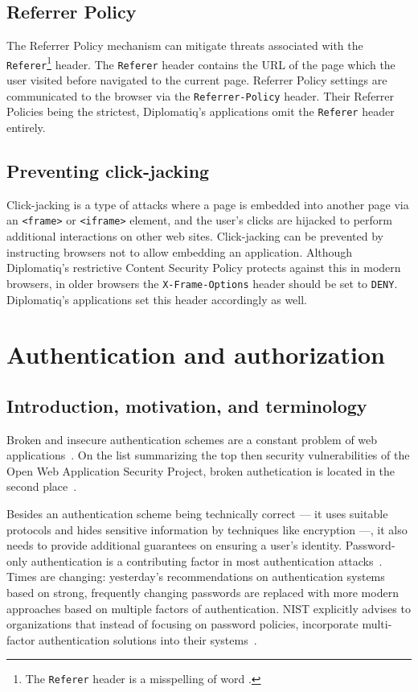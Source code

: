 \subsection{Referrer Policy}

The Referrer Policy mechanism can mitigate threats associated with the \lstinline{Referer}\footnote{The \lstinline{Referer} header is a misspelling of word .} header. The \lstinline{Referer} header contains the URL of the page which the user visited before navigated to the current page. Referrer Policy settings are communicated to the browser via the \lstinline{Referrer-Policy} header. Their Referrer Policies being the strictest, Diplomatiq's applications omit the \lstinline{Referer} header entirely.

\subsection{Preventing click-jacking}

Click-jacking is a type of attacks where a page is embedded into another page via an \lstinline{<frame>} or \lstinline{<iframe>} element, and the user's clicks are hijacked to perform additional interactions on other web sites. Click-jacking can be prevented by instructing browsers not to allow embedding an application. Although Diplomatiq's restrictive Content Security Policy protects against this in modern browsers, in older browsers the \lstinline{X-Frame-Options} header should be set to \lstinline{DENY}. Diplomatiq's applications set this header accordingly as well.

\section{Authentication and authorization}

\subsection{Introduction, motivation, and terminology}

Broken and insecure authentication schemes are a constant problem of web applications~\cite{ptsecurity-2019}. On the list summarizing the top then security vulnerabilities of the Open Web Application Security Project, broken authetication is located in the second place~\cite{owasp-topten}.

Besides an authentication scheme being technically correct — it uses suitable protocols and hides sensitive information by techniques like encryption —, it also needs to provide additional guarantees on ensuring a user's identity. Password-only authentication is a contributing factor in most authentication attacks~\cite{ptsecurity-2019}. Times are changing: yesterday's recommendations on authentication systems based on strong, frequently changing passwords are replaced with more modern approaches based on multiple factors of authentication. NIST explicitly advises to organizations that instead of focusing on password policies, incorporate multi-factor authentication solutions into their systems~\cite{nistidguide}.

